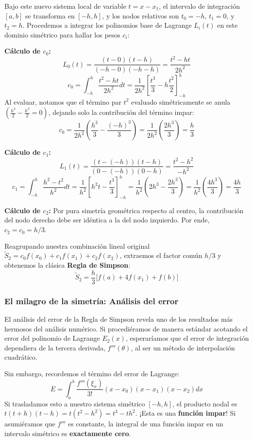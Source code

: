 Bajo este nuevo sistema local de variable $t = x - x_1$, el intervalo de integración $[a,b]$ se transforma en $[-h, h]$, y los nodos relativos son $t_0 = -h$, $t_1 = 0$, y $t_2 = h$.
Procedemos a integrar los polinomios base de Lagrange $L_i(t)$ en este dominio simétrico para hallar los pesos $c_i$:

\textbf{Cálculo de $c_0$:}
\[
    L_0(t) = \frac{(t - 0)(t - h)}{(-h - 0)(-h - h)} = \frac{t^2 - ht}{2h^2}
\]
\[
    c_0 = \int_{-h}^h \frac{t^2 - ht}{2h^2} dt = \frac{1}{2h^2} \left[ \frac{t^3}{3} - h\frac{t^2}{2} \right]_{-h}^h
\]
Al evaluar, notamos que el término par $t^2$ evaluado simétricamente se anula $\left( \frac{h^3}{2} - \frac{h^3}{2} = 0 \right)$, dejando solo la contribución del término impar:
\[
    c_0 = \frac{1}{2h^2} \left( \frac{h^3}{3} - \frac{(-h)^3}{3} \right) = \frac{1}{2h^2} \left( \frac{2h^3}{3} \right) = \frac{h}{3}
\]

\textbf{Cálculo de $c_1$:}
\[
    L_1(t) = \frac{(t - (-h))(t - h)}{(0 - (-h))(0 - h)} = \frac{t^2 - h^2}{-h^2}
\]
\[
    c_1 = \int_{-h}^h \frac{h^2 - t^2}{h^2} dt = \frac{1}{h^2} \left[ h^2 t - \frac{t^3}{3} \right]_{-h}^h = \frac{1}{h^2} \left( 2h^3 - \frac{2h^3}{3} \right) = \frac{1}{h^2} \left( \frac{4h^3}{3} \right) = \frac{4h}{3}
\]

\textbf{Cálculo de $c_2$:}
Por pura simetría geométrica respecto al centro, la contribución del nodo derecho debe ser idéntica a la del nodo izquierdo. Por ende, $c_2 = c_0 = h/3$.

Reagrupando nuestra combinación lineal original $\widetilde{S}_2 = c_0 f(x_0) + c_1 f(x_1) + c_2 f(x_2)$, extraemos el factor común $h/3$ y obtenemos la clásica \textbf{Regla de Simpson}:
\[
    \boxed{\widetilde{S}_2 = \frac{h}{3} \Big[ f(a) + 4f(x_1) + f(b) \Big]}
\]

\subsubsection{El milagro de la simetría: Análisis del error}

El análisis del error de la Regla de Simpson revela uno de los resultados más hermosos del análisis numérico. Si procediéramos de manera estándar acotando el error del polinomio de Lagrange $E_2(x)$, esperaríamos que el error de integración dependiera de la tercera derivada, $f'''(\theta)$, al ser un método de interpolación cuadrático.

Sin embargo, recordemos el término del error de Lagrange:
\[
    E = \int_a^b \frac{f'''(\xi_x)}{3!} (x - x_0)(x - x_1)(x - x_2) dx
\]
Si trasladamos esto a nuestro sistema simétrico $[-h, h]$, el producto nodal es $t(t+h)(t-h) = t(t^2 - h^2) = t^3 - th^2$. ¡Esta es una \textbf{función impar}! Si asumiéramos que $f'''$ es constante, la integral de una función impar en un intervalo simétrico es \textbf{exactamente cero}.

